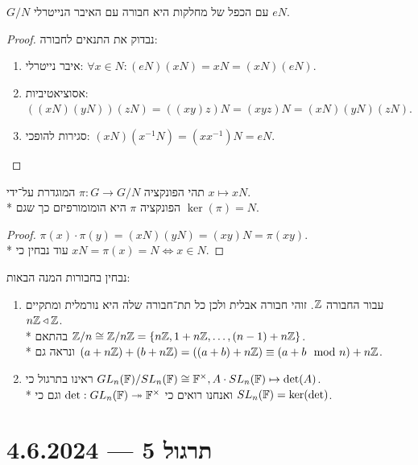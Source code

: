 \begin{proposition}
	$G/N$ עם הכפל של מחלקות היא חבורה עם האיבר הנייטרלי $eN$.
\end{proposition}
\begin{proof}
	נבדוק את התנאים לחבורה:
	\begin{enumerate}
		\item איבר נייטרלי: $\forall x \in N: (eN)(xN) = xN = (xN)(eN)$.
		\item אסוציאטיביות: $((xN)(yN))(zN) = ((xy)z)N = (xyz)N = (xN)(yN)(zN)$.
		\item סגירות להופכי: $(xN)(x^{-1}N) = (xx^{-1})N = eN$.
	\end{enumerate}
\end{proof}
\begin{proposition}
	תהי הפונקציה $\pi : G \to G/N$ המוגדרת על־ידי $x \mapsto x N$. \\*
	הפונקציה $\pi$ היא הומומורפיזם כך שגם $\ker(\pi) = N$.
\end{proposition}
\begin{proof}
	$\pi(x) \cdot \pi(y) = (xN)(yN) = (xy)N = \pi(xy)$. \\*
	עוד נבחין כי $x N = \pi(x) = N \iff x \in N$.
\end{proof}
\begin{example}
	נבחין בחבורות המנה הבאות:
	\begin{enumerate}
		\item עבור החבורה $\mathbb{Z}$. זוהי חבורה אבלית ולכן כל תת־חבורה שלה היא נורמלית ומתקיים $n \mathbb{Z} \triangleleft \mathbb{Z}$. \\*
			בהתאם $\mathbb{Z}/n \cong \mathbb{Z} / n \mathbb{Z} = \{ n \mathbb{Z}, 1 + n \mathbb{Z}, \dots, (n - 1) + n \mathbb{Z} \}$. \\*
			ונראה גם $(a + n \mathbb{Z}) + (b + n \mathbb{Z}) = ((a + b) + n \mathbb{Z}) \equiv (a + b \mod n) + n \mathbb{Z}$.
		\item ראינו בתרגול כי $GL_n(\mathbb{F}) / SL_n(\mathbb{F}) \cong \mathbb{F}^\times, A \cdot SL_n(\mathbb{F}) \mapsto \det(A)$. \\*
			ואנחנו רואים כי $\det : GL_n(\mathbb{F}) \twoheadrightarrow \mathbb{F}^\times$ וגם כי $SL_n(\mathbb{F}) = \ker(\det)$.
	\end{enumerate}
\end{example}

\section{תרגול 5 --- 4.6.2024}
